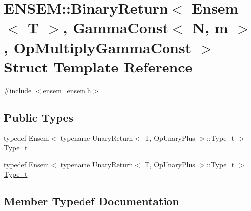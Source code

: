 \hypertarget{structENSEM_1_1BinaryReturn_3_01Ensem_3_01T_01_4_00_01GammaConst_3_01N_00_01m_01_4_00_01OpMultiplyGammaConst_01_4}{}\section{E\+N\+S\+EM\+:\+:Binary\+Return$<$ Ensem$<$ T $>$, Gamma\+Const$<$ N, m $>$, Op\+Multiply\+Gamma\+Const $>$ Struct Template Reference}
\label{structENSEM_1_1BinaryReturn_3_01Ensem_3_01T_01_4_00_01GammaConst_3_01N_00_01m_01_4_00_01OpMultiplyGammaConst_01_4}


{\ttfamily \#include $<$ensem\+\_\+ensem.\+h$>$}

\subsection*{Public Types}
\begin{DoxyCompactItemize}
\item 
typedef \mbox{\hyperlink{classENSEM_1_1Ensem}{Ensem}}$<$ typename \mbox{\hyperlink{structENSEM_1_1UnaryReturn}{Unary\+Return}}$<$ T, \mbox{\hyperlink{structENSEM_1_1OpUnaryPlus}{Op\+Unary\+Plus}} $>$\+::\mbox{\hyperlink{structENSEM_1_1BinaryReturn_3_01Ensem_3_01T_01_4_00_01GammaConst_3_01N_00_01m_01_4_00_01OpMultiplyGammaConst_01_4_a1e55c80ef6e9dca68a09e4de3cc64da6}{Type\+\_\+t}} $>$ \mbox{\hyperlink{structENSEM_1_1BinaryReturn_3_01Ensem_3_01T_01_4_00_01GammaConst_3_01N_00_01m_01_4_00_01OpMultiplyGammaConst_01_4_a1e55c80ef6e9dca68a09e4de3cc64da6}{Type\+\_\+t}}
\item 
typedef \mbox{\hyperlink{classENSEM_1_1Ensem}{Ensem}}$<$ typename \mbox{\hyperlink{structENSEM_1_1UnaryReturn}{Unary\+Return}}$<$ T, \mbox{\hyperlink{structENSEM_1_1OpUnaryPlus}{Op\+Unary\+Plus}} $>$\+::\mbox{\hyperlink{structENSEM_1_1BinaryReturn_3_01Ensem_3_01T_01_4_00_01GammaConst_3_01N_00_01m_01_4_00_01OpMultiplyGammaConst_01_4_a1e55c80ef6e9dca68a09e4de3cc64da6}{Type\+\_\+t}} $>$ \mbox{\hyperlink{structENSEM_1_1BinaryReturn_3_01Ensem_3_01T_01_4_00_01GammaConst_3_01N_00_01m_01_4_00_01OpMultiplyGammaConst_01_4_a1e55c80ef6e9dca68a09e4de3cc64da6}{Type\+\_\+t}}
\end{DoxyCompactItemize}


\subsection{Member Typedef Documentation}
\mbox{\label{structENSEM_1_1BinaryReturn_3_01Ensem_3_01T_01_4_00_01GammaConst_3_01N_00_01m_01_4_00_01OpMultiplyGammaConst_01_4_a1e55c80ef6e9dca68a09e4de3cc64da6}} 
